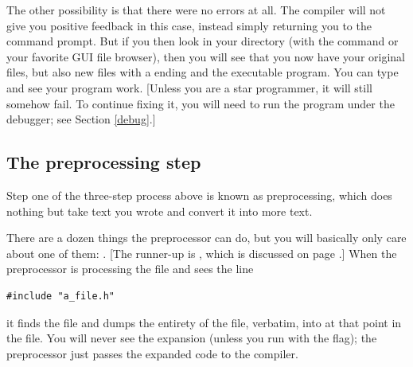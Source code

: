The other possibility is that there were no errors at all. The compiler
will not give you positive feedback in this case, instead simply returning
you to the command prompt. But if you then look in your directory
(with the command  or your favorite GUI file browser),
then you will see that you now have your original  files,
but also new files with a  ending and the 
executable program. You can type  and see your program
work. [Unless you are a star programmer, it will still somehow fail. To
continue fixing it, you will need to run the program under the debugger;
see Section \ref{debug}.]

\subsection{The preprocessing step} \label{headers}
Step one of the three-step process above is known as preprocessing,
which does nothing but take text you wrote and convert it into more text.

There are a dozen things the preprocessor can do, but you will basically only care about one of them: . 
[The runner-up is , which is discussed on page \pageref{macros}.] 
When the preprocessor is processing the file  and sees
the line
\begin{lstlisting}
#include "a_file.h"
\end{lstlisting}
it finds the file  and dumps the entirety of the file,
verbatim, into  at that point in the file. You will never
see the expansion (unless you run  with the 
flag); the preprocessor just passes the expanded code to the compiler.

